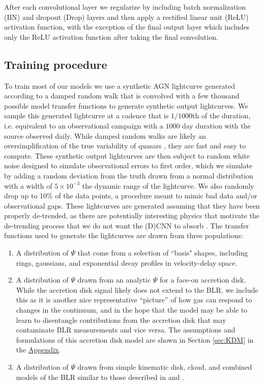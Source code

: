 \documentclass[floatfix,twocolumn,trackchanges,linenumbers]{aastex7}
\begin{document}
After each convolutional layer we regularize by including batch normalization (BN) and dropout (Drop) layers and then apply a rectified linear unit (ReLU) activation function, with the exception of the final output layer which includes only the ReLU activation function after taking the final convolution. 

\subsection{Training procedure}
To train most of our models we use a synthetic AGN lightcurve generated according to a damped random walk \citep{DRW_2_Kozlowski2010, DRW_MacLeod2010} that is convolved with a few thousand possible model transfer functions to generate synthetic output lightcurves. We sample this generated lightcurve at a cadence that is $1/1000$th of the duration, i.e. equivalent to an observational campaign with a $1000$ day duration with the source observed daily. While 
damped random walks are likely an oversimplification of the true variability of quasars \citep{DRW_Complications_Kasliwal2015,Beyond_DRW_Yu2022}, they are fast and easy to compute. These synthetic output lightcurves are then subject to random white noise designed to simulate observational errors to first order, which we simulate by adding a random deviation from the truth drawn from a normal distribution with a width of $5\times10^{-3}$ the dynamic range of the lightcurve. We also randomly drop up to 10\% of the data points, a procedure meant to mimic bad data and/or observational gaps. These lightcurves are generated assuming that they have been properly de-trended, as there are potentially interesting physics that motivate the de-trending process that we do not want the (D)CNN to absorb \citep{STORM_ECHO}. The transfer functions used to generate the lightcurves are drawn from three populations: 
\begin{enumerate}
    \item A distribution of $\Psi$ that come from a selection of ``basis" shapes, including rings, gaussians, and exponential decay profiles in velocity-delay space. 
    \item A distribution of $\Psi$ drawn from an analytic $\Psi$ for a face-on accretion disk. While the accretion disk signal likely does not extend to the BLR, we include this as it is another nice representative ``picture'' of how gas can respond to changes in the continuum, and in the hope that the model may be able to learn to disentangle contributions from the accretion disk that may contaminate BLR measurements and vice versa. The assumptions and formulations of this accretion disk model are shown in Section \ref{sec:KDM} in the \hyperref[appendix]{Appendix}.
    \item A distribution of $\Psi$ drawn from simple kinematic disk, cloud, and combined models of the BLR similar to those described in \cite{Long_2023} and \cite{Long_2025}.
\end{enumerate}
\end{document}
